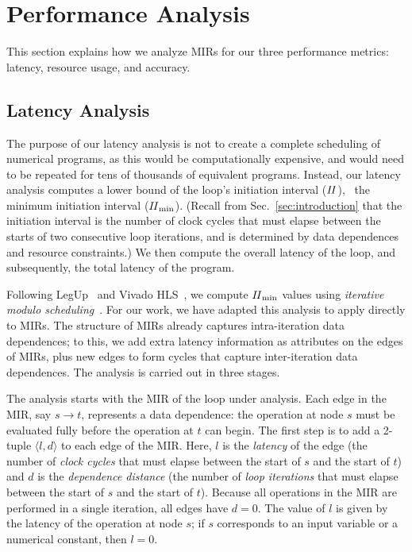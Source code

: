 \section{Performance Analysis}
\label{sec:performance_analysis}

This section explains how we analyze MIRs for our three performance metrics:
latency, resource usage, and accuracy. %

\subsection{Latency Analysis}
\label{sub:latency_analysis}

The purpose of our latency analysis is not to create a complete scheduling
of numerical programs, as this would be computationally expensive, and
would need to be repeated for tens of thousands of equivalent programs.
Instead, our latency analysis computes a lower bound of the loop's initiation
interval ($\mathit{II}$), \ie~the minimum initiation interval ($\mathit{II}_{\rm min}$).  (Recall from
Sec.~\ref{sec:introduction} that the initiation interval is the number of clock
cycles that must elapse between the starts of two consecutive loop iterations,
and is determined by data dependences and resource constraints.)  We then
compute the overall latency of the loop, and subsequently, the total latency of
the program.

Following LegUp~\cite{legup} and Vivado HLS~\cite{vivado_hls}, we compute
$\mathit{II}_{\rm min}$ values using \emph{iterative modulo scheduling}~\cite{rau94}. For our
work, we have adapted this analysis to apply directly to MIRs. The structure of
MIRs already captures intra-iteration data dependences; to this, we add extra
latency information as attributes on the edges of MIRs, plus new edges to form
cycles that capture inter-iteration data dependences.  The analysis is carried
out in three stages.

The analysis starts with the MIR of the loop under analysis. Each edge in the
MIR, say $s\rightarrow t$, represents a data dependence: the operation at
node $s$ must be evaluated fully before the operation at $t$ can begin. The
first step is to add a 2-tuple $\langle l, d \rangle$ to each edge of the
MIR\@. Here, $l$ is the \emph{latency} of the edge (the number of \emph{clock
cycles} that must elapse between the start of $s$ and the start of $t$) and
$d$ is the \emph{dependence distance} (the number of \emph{loop iterations}
that must elapse between the start of $s$ and the start of $t$). Because all
operations in the MIR are performed in a single iteration, all edges have
$d=0$. The value of $l$ is given by the latency of the operation at node $s$;
if $s$ corresponds to an input variable or a numerical constant, then $l=0$.

